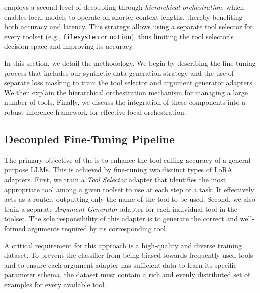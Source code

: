 \sys{} employs a second level of decoupling through \emph{hierarchical orchestration}, which enables local models to operate on shorter context lengths, thereby benefiting both accuracy and latency. This strategy allows using a separate tool selector for every toolset (e.g., \texttt{filesystem} or \texttt{notion}), thus limiting the tool selector's decision space and improving its accuracy.

In this section, we detail the \sys{} methodology. We begin by describing the fine-tuning process that includes our synthetic data generation strategy and the use of separate loss masking to train the tool selector and argument generator adapters. We then explain the hierarchical orchestration mechanism for managing a large number of tools. Finally, we discuss the integration of these components into a robust inference framework for effective local orchestration. 

\subsection{Decoupled Fine-Tuning Pipeline}
The primary objective of the \decoupled{} is to enhance the tool-calling accuracy of a general-purpose LLMs. This is achieved by fine-tuning two distinct types of LoRA 
adapters. First, we train a \emph{Tool Selector} adapter that identifies the most appropriate tool among a given toolset to use at each step of a task. It effectively acts as a router, outputting only the name of the tool to be used. Second, we also train a separate \emph{Argument Generator} adapter for each individual tool in the toolset. The sole responsibility of this adapter is to generate the correct and well-formed arguments required by its corresponding tool.

A critical requirement for this approach is a high-quality and diverse training dataset. To prevent the classifier from being biased towards frequently used tools and to ensure each argument adapter has sufficient data to learn its specific parameter schema, the dataset must contain a rich and evenly distributed set of examples for every available tool.

